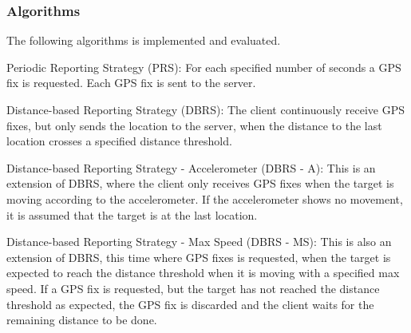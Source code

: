 \subsubsection{Algorithms}
The following algorithms is implemented and evaluated.

Periodic Reporting Strategy (PRS): For each specified number of seconds a GPS fix is requested. Each GPS fix is sent to the server.

Distance-based Reporting Strategy (DBRS): The client continuously receive GPS fixes, but only sends the location to the server, when the distance to the last location crosses a specified distance threshold.

Distance-based Reporting Strategy - Accelerometer (DBRS - A): This is an extension of DBRS, where the client only receives GPS fixes when the target is moving according to the accelerometer. If the accelerometer shows no movement, it is assumed that the target is at the last location.

Distance-based Reporting Strategy - Max Speed (DBRS - MS): This is also an extension of DBRS, this time where GPS fixes is requested, when the target is expected to reach the distance threshold when it is moving with a specified max speed. If a GPS fix is requested, but the target has not reached the distance threshold as expected, the GPS fix is discarded and the client waits for the remaining distance to be done.